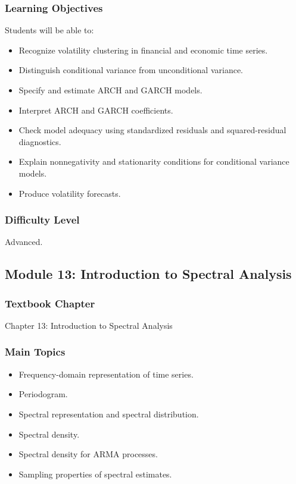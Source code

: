 \documentclass[11pt]{article}
\begin{document}
\subsubsection*{Learning Objectives}
Students will be able to:
\begin{itemize}
    \item Recognize volatility clustering in financial and economic time series.
    \item Distinguish conditional variance from unconditional variance.
    \item Specify and estimate ARCH and GARCH models.
    \item Interpret ARCH and GARCH coefficients.
    \item Check model adequacy using standardized residuals and squared-residual diagnostics.
    \item Explain nonnegativity and stationarity conditions for conditional variance models.
    \item Produce volatility forecasts.
\end{itemize}

\subsubsection*{Difficulty Level}
Advanced.

\subsection{Module 13: Introduction to Spectral Analysis}

\subsubsection*{Textbook Chapter}
Chapter 13: Introduction to Spectral Analysis

\subsubsection*{Main Topics}
\begin{itemize}
    \item Frequency-domain representation of time series.
    \item Periodogram.
    \item Spectral representation and spectral distribution.
    \item Spectral density.
    \item Spectral density for ARMA processes.
    \item Sampling properties of spectral estimates.
\end{itemize}
\end{document}
